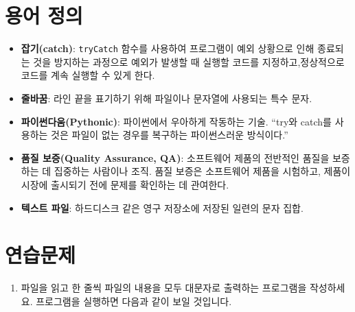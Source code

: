 \documentclass[
  letterpaper,
]{book}
\providecommand{\tightlist}{%
  \setlength{\itemsep}{0pt}\setlength{\parskip}{0pt}}\usepackage{longtable,booktabs,array}
\begin{document}
\section{용어 정의}\label{r-file-terminology}

\begin{itemize}
\tightlist
\item
  \textbf{잡기(catch)}: \texttt{tryCatch} 함수를 사용하여 프로그램이
  예외 상황으로 인해 종료되는 것을 방지하는 과정으로 예외가 발생할 때
  실행할 코드를 지정하고,정상적으로 코드를 계속 실행할 수 있게 한다.
\item
  \textbf{줄바꿈}: 라인 끝을 표기하기 위해 파일이나 문자열에 사용되는
  특수 문자. 
\item
  \textbf{파이썬다움(Pythonic)}: 파이썬에서 우아하게 작동하는 기술.
  ``try와 catch를 사용하는 것은 파일이 없는 경우를 복구하는 파이썬스러운
  방식이다.'' 
\item
  \textbf{품질 보증(Quality Assurance, QA)}: 소프트웨어 제품의 전반적인
  품질을 보증하는 데 집중하는 사람이나 조직. 품질 보증은 소프트웨어
  제품을 시험하고, 제품이 시장에 출시되기 전에 문제를 확인하는 데
  관여한다. 
\item
  \textbf{텍스트 파일}: 하드디스크 같은 영구 저장소에 저장된 일련의 문자
  집합. 
\end{itemize}

\section*{연습문제}\label{r-file-ex}


\begin{enumerate}
\def\labelenumi{\arabic{enumi}.}
\tightlist
\item
  파일을 읽고 한 줄씩 파일의 내용을 모두 대문자로 출력하는 프로그램을
  작성하세요. 프로그램을 실행하면 다음과 같이 보일 것입니다.
\end{enumerate}
\end{document}
